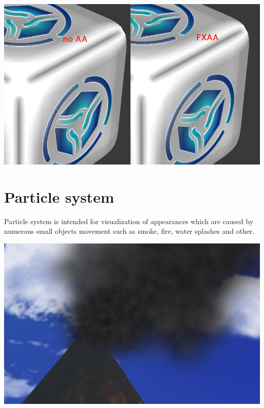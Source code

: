 \documentclass[a4paper,12pt,oneside]{sphinxmanual}
\begin{document}
{\hfill\includegraphics[width=1.000\linewidth]{antialiasing.jpg}\hfill}

\begin{DUlineblock}{0em}
\item[] 
\end{DUlineblock}
\label{particles:particles}

\chapter{Particle system}
\label{particles:index-0}\label{particles::doc}\label{particles:id1}
Particle system is intended for visualization of appearances which are caused by numerous small objects movement such as smoke, fire, water splashes and other.

{\hfill\includegraphics[width=1.000\linewidth]{particles_smoke.jpg}\hfill}

\begin{DUlineblock}{0em}
\item[] 
\end{DUlineblock}
\end{document}
